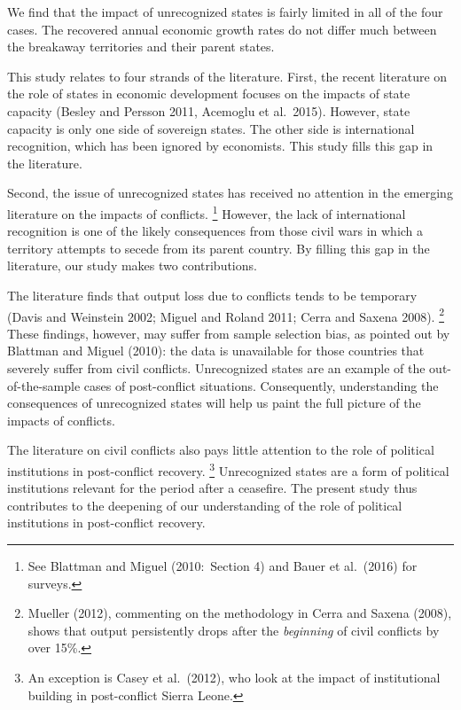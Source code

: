 \documentclass[12pt,a4paper]{article}%
\begin{document}
We find that the impact of unrecognized states is fairly limited in all of the four cases. 
The recovered annual economic growth rates do not differ much between the breakaway territories and their parent states.

This study relates to four strands of the literature. 
First, the recent literature on the role of states in economic development focuses on the impacts of state capacity (Besley and Persson 2011, Acemoglu et al.\ 2015). 
However, state capacity is only one side of sovereign states. 
The other side is international recognition, which has been ignored by economists. 
This study fills this gap in the literature.

Second, the issue of unrecognized states has received no attention in the emerging literature on the impacts of conflicts.%
\footnote{
	See Blattman and Miguel (2010:\ Section 4) and Bauer et al.\ (2016) for surveys.
}  
However, the lack of international recognition is one of the likely consequences from those civil wars in which a territory attempts to secede from its parent country. 
By filling this gap in the literature, our study makes two contributions. 

The literature finds that output loss due to conflicts tends to be temporary (Davis and Weinstein 2002; Miguel and Roland 2011; Cerra and Saxena 2008).%
\footnote{
	Mueller (2012), commenting on the methodology in Cerra and Saxena (2008), shows that output persistently drops after the \textit{beginning} of civil conflicts by over 15\%.
} 
These findings, however, may suffer from sample selection bias, as pointed out by Blattman and Miguel (2010): the data is unavailable for those countries that severely suffer from civil conflicts.   
Unrecognized states are an example of the out-of-the-sample cases of post-conflict situations. 
Consequently, understanding the consequences of unrecognized states will help us paint the full picture of the impacts of conflicts. 

The literature on civil conflicts also pays little attention to the role of political institutions in post-conflict recovery.%
\footnote{
	An exception is Casey et al.\ (2012), who look at the impact of institutional building in post-conflict Sierra Leone.
}
Unrecognized states are a form of political institutions relevant for the period after a ceasefire. 
The present study thus contributes to the deepening of our understanding of the role of political institutions in post-conflict recovery.
\end{document}
